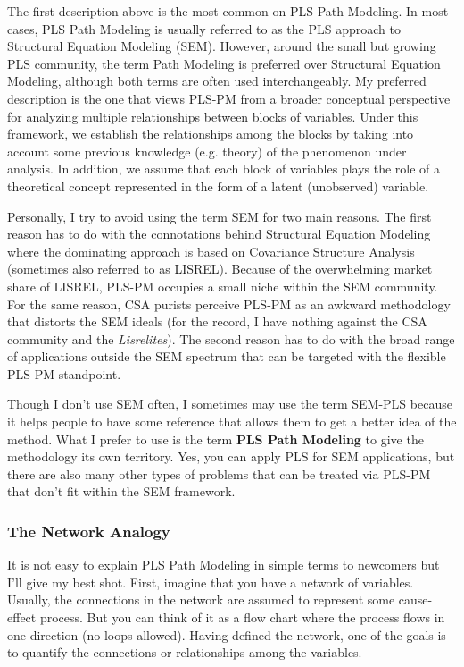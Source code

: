 \documentclass[12pt]{book}\usepackage{graphicx, color}
\begin{document}
The first description above is the most common on PLS Path Modeling. In most cases, PLS Path Modeling is usually referred to as the PLS approach to Structural Equation Modeling (SEM). However, around the small but growing PLS community, the term Path Modeling is preferred over Structural Equation Modeling, although both terms are often used interchangeably. My preferred description is the one that views PLS-PM from a broader conceptual perspective for analyzing multiple relationships between blocks of variables. Under this framework, we establish the relationships among the blocks by taking into account some previous knowledge (e.g. theory) of the phenomenon under analysis. In addition, we assume that each block of variables plays the role of a theoretical concept represented in the form of a latent (unobserved) variable.

Personally, I try to avoid using the term SEM for two main reasons. The first reason has to do with the connotations behind Structural Equation Modeling where the dominating approach is based on Covariance Structure Analysis (sometimes also referred to as LISREL). Because of the overwhelming market share of LISREL, PLS-PM occupies a small niche within the SEM community. For the same reason, CSA purists perceive PLS-PM as an awkward methodology that distorts the SEM ideals (for the record, I have nothing against the CSA community and the \textit{Lisrelites}). The second reason has to do with the broad range of applications outside the SEM spectrum that can be targeted with the flexible PLS-PM standpoint. 

Though I don't use SEM often, I sometimes may use the term SEM-PLS because it helps people to have some reference that allows them to get a better idea of the method. What I prefer to use is the term \textbf{PLS Path Modeling} to give the methodology its own territory. Yes, you can apply PLS for SEM applications, but there are also many other types of problems that can be treated via PLS-PM that don't fit within the SEM framework.


\subsubsection*{The Network Analogy}
It is not easy to explain PLS Path Modeling in simple terms to newcomers but I'll give my best shot. First, imagine that you have a network of variables. Usually, the connections in the network are assumed to represent some cause-effect process. But you can think of it as a flow chart where the process flows in one direction (no loops allowed). Having defined the network, one of the goals is to quantify the connections or relationships among the variables. 
\end{document}
